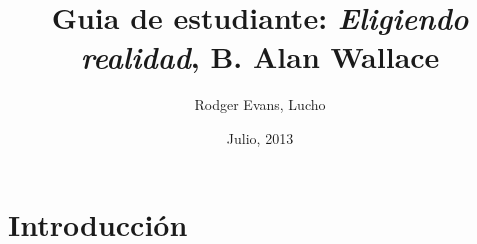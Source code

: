 \documentclass[11pt]{book}
\begin{document}
\title{Guia de estudiante: \emph{Eligiendo realidad}, B. Alan Wallace}
\author{Rodger Evans, Lucho}
\date{ Julio, 2013}
\maketitle

\chapter{Introducci\'on}

\subsection{}




%
%
\end{document}
